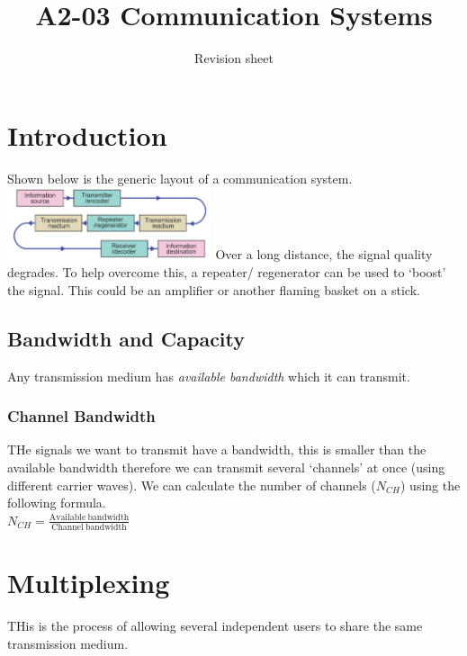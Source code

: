 \documentclass[a4paper,11pt, twocolumn]{article}
\title{A2-03 Communication Systems}
\author{Revision sheet}
\date{}
\begin{document}
\maketitle
\thispagestyle{fancy}

\section{Introduction}
Shown below is the generic layout of a communication system.
\includegraphics[width=0.45\textwidth]{genericSystemLayout.jpg}
Over a long distance, the signal quality degrades. To help overcome this, a repeater/ regenerator can be used to `boost' the signal. This could be an amplifier or another flaming basket on a stick.
\subsection{Bandwidth and Capacity}
Any transmission medium has \textit{available bandwidth} which it can transmit.
\subsubsection{Channel Bandwidth}
THe signals we want to transmit have a bandwidth, this is smaller than the available bandwidth therefore we can transmit several `channels' at once (using different carrier waves). We can calculate the number of channels ($N_{CH}$) using the following formula.\\
$\displaystyle N_{CH} = \frac{\mathrm{Available\ bandwidth}}{\mathrm{Channel\ bandwidth}}$

\section{Multiplexing}
THis is the process of allowing several independent users to share the same transmission medium.
\end{document}
